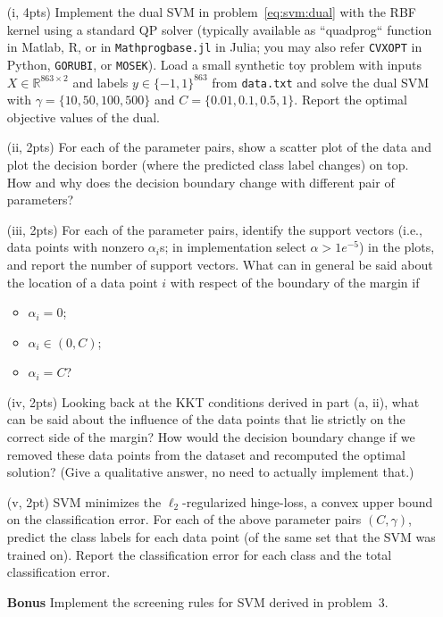 \documentclass{article}
\theoremstyle{remark}
\theoremstyle{definition}
\begin{document}
\begin{enumerate}
    \item[(i, 4pts)] Implement the dual SVM in problem~\eqref{eq:svm:dual} with the RBF kernel using a standard QP solver (typically available as ``quadprog`` function in Matlab, R, or in \texttt{Mathprogbase.jl} in Julia; you may also refer \texttt{CVXOPT} in Python, \texttt{GORUBI}, or \texttt{MOSEK}).
    Load a small synthetic toy problem with inputs $X \in \mathbb R^{863 \times 2}$ and labels $y \in \{-1, 1\}^{863}$ from \texttt{data.txt} and solve the dual SVM with $\gamma = \{10, 50, 100, 500\}$ and $C = \{0.01, 0.1, 0.5, 1\}$. Report the optimal objective values of the dual. 
    
    \item[(ii, 2pts)] For each of the parameter pairs, show a scatter plot of the data
        and plot the decision border (where the predicted class label changes) on top.
        How and why does the decision boundary change with different pair of parameters?

	\item[(iii, 2pts)] For each of the parameter pairs, identify the support vectors (i.e., data points with nonzero $\alpha_i$s; in implementation select $\alpha > 1e^{-5}$) in the plots, and report the number of support vectors.
	What can in general be said about the location of a data point $i$ with respect of the boundary of the margin if
        \begin{itemize}
            \item $\alpha_i = 0$;
            \item $\alpha_i \in (0, C)$;
            \item $\alpha_i = C$?
        \end{itemize}
     
    \item[(iv, 2pts)]
        Looking back at the KKT conditions derived in part (a, ii), what can be said about the
        influence of the data points that lie strictly on the correct side of the
        margin?
        How would the decision boundary change if we removed these data points from
        the dataset and recomputed the optimal solution? (Give a qualitative
        answer, no need to actually implement that.)

    \item[(v, 2pt)]
        SVM minimizes the $\ell_2$-regularized
        hinge-loss, a convex upper bound on the classification error.
        For each of the above parameter pairs $(C, \gamma)$, predict the class labels for each data point (of the same set that the
        SVM was trained on). Report the classification error for each class and the total classification error.

    \item[{\bf Bonus}] Implement the screening rules for SVM derived in problem~$3$.
\end{enumerate}
\end{document}
